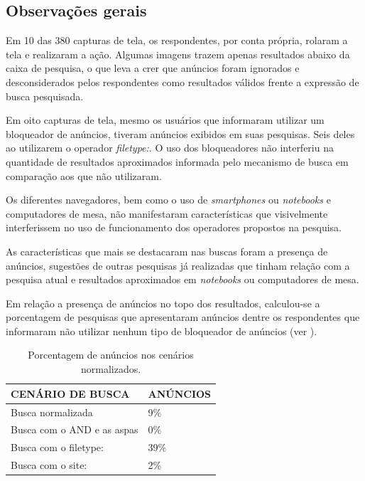 \documentclass[portuguese]{textolivre}
\begin{document}
\subsection{Observações gerais}\label{sec-outras-estr}
Em 10 das 380 capturas de tela, os respondentes, por conta própria, rolaram a tela e realizaram a ação. Algumas imagens trazem apenas resultados abaixo da caixa de pesquisa, o que leva a crer que anúncios foram ignorados e desconsiderados pelos respondentes como resultados válidos frente a expressão de busca pesquisada.

Em oito capturas de tela, mesmo os usuários que informaram utilizar um bloqueador de anúncios, tiveram anúncios exibidos em suas pesquisas. Seis deles ao utilizarem o operador \textit{filetype:}. O uso dos bloqueadores não interferiu na quantidade de resultados aproximados informada pelo mecanismo de busca em comparação aos que não utilizaram.

Os diferentes navegadores, bem como o uso de \textit{smartphones} ou \textit{notebooks} e computadores de mesa, não manifestaram características que visivelmente interferissem no uso de funcionamento dos operadores propostos na pesquisa.

As características que mais se destacaram nas buscas foram a presença de anúncios, sugestões de outras pesquisas já realizadas que tinham relação com a pesquisa atual e resultados aproximados em \textit{notebooks} ou computadores de mesa.

Em relação a presença de anúncios no topo dos resultados, calculou-se a porcentagem de pesquisas que apresentaram anúncios dentre os respondentes que informaram não utilizar nenhum tipo de bloqueador de anúncios (ver ).

\begin{table}[h!]
\centering
\begin{threeparttable}
\caption{Porcentagem de anúncios nos cenários normalizados.}
\label{tab03}
\begin{tabular}{l l}
\toprule
 \textbf{CENÁRIO DE BUSCA} & \textbf{ANÚNCIOS} \\
 \midrule
Busca normalizada & 9\% \\
Busca com o AND e as aspas & 0\% \\
Busca com o filetype: & 39\% \\
Busca com o site: & 2\% \\
\bottomrule
\end{tabular}
\end{threeparttable}
\end{table}
\end{document}
